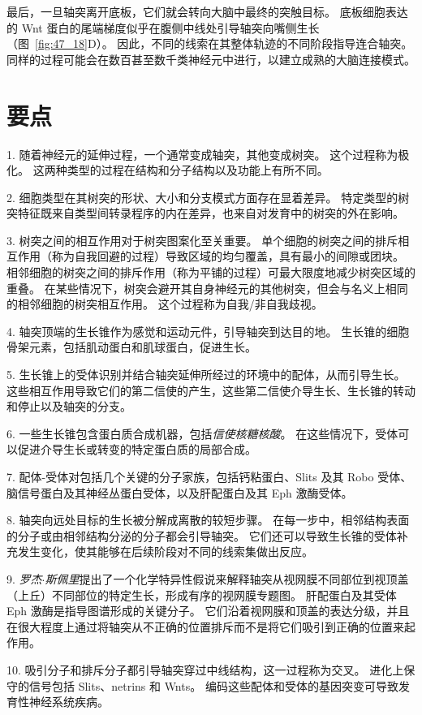 最后，一旦轴突离开底板，它们就会转向大脑中最终的突触目标。
底板细胞表达的 Wnt 蛋白的尾端梯度似乎在腹侧中线处引导轴突向嘴侧生长（图~\ref{fig:47_18}D）。
因此，不同的线索在其整体轨迹的不同阶段指导连合轴突。
同样的过程可能会在数百甚至数千类神经元中进行，以建立成熟的大脑连接模式。



\section{要点}

1. 随着神经元的延伸过程，一个通常变成轴突，其他变成树突。
这个过程称为极化。
这两种类型的过程在结构和分子结构以及功能上有所不同。 


2. 细胞类型在其树突的形状、大小和分支模式方面存在显着差异。
特定类型的树突特征既来自类型间转录程序的内在差异，也来自对发育中的树突的外在影响。


3. 树突之间的相互作用对于树突图案化至关重要。
单个细胞的树突之间的排斥相互作用（称为自我回避的过程）导致区域的均匀覆盖，具有最小的间隙或团块。
相邻细胞的树突之间的排斥作用（称为平铺的过程）可最大限度地减少树突区域的重叠。
在某些情况下，树突会避开其自身神经元的其他树突，但会与名义上相同的相邻细胞的树突相互作用。
这个过程称为自我/非自我歧视。


4. 轴突顶端的生长锥作为感觉和运动元件，引导轴突到达目的地。
生长锥的细胞骨架元素，包括肌动蛋白和肌球蛋白，促进生长。


5. 生长锥上的受体识别并结合轴突延伸所经过的环境中的配体，从而引导生长。
这些相互作用导致它们的第二信使的产生，这些第二信使介导生长、生长锥的转动和停止以及轴突的分支。


6. 一些生长锥包含蛋白质合成机器，包括\textit{信使核糖核酸}。
在这些情况下，受体可以促进介导生长或转变的特定蛋白质的局部合成。


7. 配体-受体对包括几个关键的分子家族，包括钙粘蛋白、Slits 及其 Robo 受体、脑信号蛋白及其神经丛蛋白受体，以及肝配蛋白及其 Eph 激酶受体。


8. 轴突向远处目标的生长被分解成离散的较短步骤。 在每一步中，相邻结构表面的分子或由相邻结构分泌的分子都会引导轴突。
它们还可以导致生长锥的受体补充发生变化，使其能够在后续阶段对不同的线索集做出反应。


9. \textit{罗杰$\cdot$斯佩里}提出了一个化学特异性假说来解释轴突从视网膜不同部位到视顶盖（上丘）不同部位的特定生长，形成有序的视网膜专题图。
肝配蛋白及其受体 Eph 激酶是指导图谱形成的关键分子。
它们沿着视网膜和顶盖的表达分级，并且在很大程度上通过将轴突从不正确的位置排斥而不是将它们吸引到正确的位置来起作用。


10. 吸引分子和排斥分子都引导轴突穿过中线结构，这一过程称为交叉。
进化上保守的信号包括 Slits、netrins 和 Wnts。
编码这些配体和受体的基因突变可导致发育性神经系统疾病。

